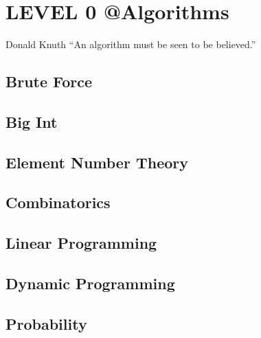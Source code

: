 \chapter{LEVEL 0 @Algorithms}
\begin{chapquote}{Donald Knuth}
	``An algorithm must be seen to be believed.''
\end{chapquote}

\section{Brute Force}

\section{Big Int}

\section{Element Number Theory}

\section{Combinatorics}

\section{Linear Programming}

\section{Dynamic Programming}

\section{Probability}
